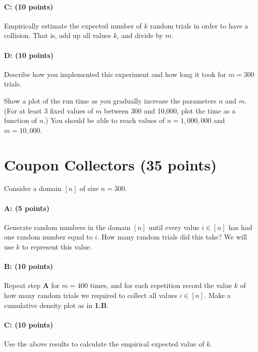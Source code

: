 \documentclass[11pt]{article}
\begin{document}
\paragraph{C: (10 points)}  
Empirically estimate the expected number of $k$ random trials in order to have a collision.  That is, add up all values $k$, and divide by $m$.  

\paragraph{D: (10 points)}  
Describe how you implemented this experiment and how long it took for $m = 300$ trials.  

Show a plot of the run time as you gradually increase the parameters $n$ and $m$.  
(For at least 3 fixed values of $m$ between 300 and 10,000, plot the time as a function of $n$.)
You should be able to reach values of $n = 1{,}000{,}000$ and $m = 10{,}000$.  


\section{Coupon Collectors (35 points)}

Consider a domain $[n]$ of size $n = 300$.  

\paragraph{A: (5 points)}
Generate random numbers in the domain $[n]$ until every value $i \in [n]$ has had one random number equal to $i$.
How many random trials did this take?  
We will use $k$ to represent this value.  

\paragraph{B: (10 points)}
Repeat step {\textbf{\sffamily A}} for $m=400$ times, and for each repetition record the value $k$ of how many random trials we required to collect all values $i \in [n]$.  
Make a cumulative density plot as in   {\textbf{\sffamily 1.B}}.  

\paragraph{C: (10 points)}
Use the above results to calculate the empirical expected value of $k$.
\end{document}

